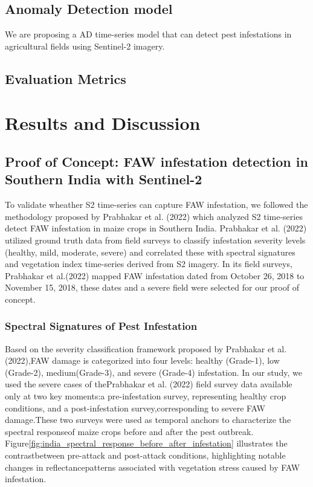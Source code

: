 \documentclass{article} %
\begin{document}
    \subsection{Anomaly Detection model}
        We are proposing a AD time-series model that can detect pest infestations in agricultural fields using Sentinel-2 imagery. 

    \subsection{Evaluation Metrics}

    \section{Results and Discussion}

        \subsection{Proof of Concept: FAW infestation detection in Southern India with Sentinel-2}
            To validate wheather S2 time-series can capture FAW infestation, we followed the methodology proposed by Prabhakar et al. (2022) which analyzed S2 time-series detect FAW infestation in maize crops in Southern India. Prabhakar et al. (2022) utilized ground truth data from field surveys to classify infestation severity levels (healthy, mild, moderate, severe) and correlated these with spectral signatures and vegetation index time-series derived from S2 imagery. In its field surveys, Prabhakar et al.(2022) mapped FAW infestation dated from October 26, 2018 to November 15, 2018, these dates and a severe field were selected for our proof of concept.

            \subsubsection{Spectral Signatures of Pest Infestation}
                Based on the severity classification framework proposed by Prabhakar et al. (2022),FAW damage is categorized into four levels: healthy (Grade-1), low (Grade-2), medium(Grade-3), and severe (Grade-4) infestation. In our study, we used the severe cases of thePrabhakar et al. (2022) field survey data available only at two key moments:a pre-infestation survey, representing healthy crop conditions, and a post-infestation survey,corresponding to severe FAW damage.These two surveys were used as temporal anchors to characterize the spectral responseof maize crops before and after the pest outbreak. Figure\ref{fig:india_spectral_response_before_after_infestation} illustrates the contrastbetween pre-attack and post-attack conditions, highlighting notable changes in reflectancepatterns associated with vegetation stress caused by FAW infestation.
\end{document}
